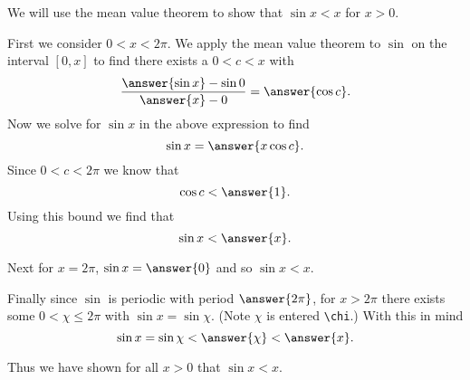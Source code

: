 \documentclass{ximera}
\author{Steven Gubkin}
\begin{document}
\begin{exercise}

We will use the mean value theorem to show that $\sin x<x$ for $x>0$.

First we consider $0<x<2\pi$.  We apply the mean value theorem to $\sin$ on the interval $[0,x]$ to find there exists a $0<c<x$ with 
\[
\frac{\answer{\sin{x}}-\sin{0}}{\answer{x}-0} = \answer{\cos{c}}.
\]
Now we solve for $\sin{x}$ in the above expression to find
\[
\sin{x} = \answer{x\cos{c}}.
\]
Since $0<c<2\pi$ we know that 
\[
\cos{c} < \answer{1}.
\]
Using this bound we find that 
\[
\sin{x} < \answer{x}.
\]

Next for $x=2\pi$, $\sin{x}=\answer{0}$ and so $\sin{x}<x$.

Finally since $\sin$ is periodic with period $\answer{2\pi}$, for $x>2\pi$ there exists some $0<\chi\leq2\pi$ with $\sin{x}=\sin{\chi}$. (Note $\chi$ is entered \verb|\chi|.)  With this in mind
\[
\sin{x}=\sin{\chi}<\answer{\chi}<\answer{x}.
\]

Thus we have shown for all $x>0$ that $\sin{x}<x$.

\end{exercise}
\end{document}
